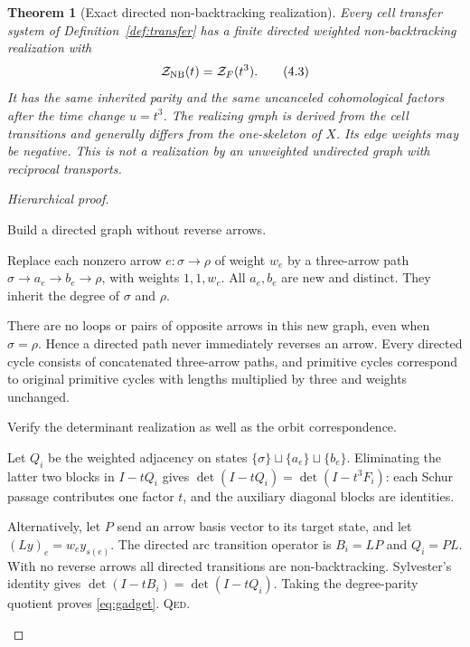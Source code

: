 \documentclass[11pt,a4paper]{article}
\newtheorem{theorem}[definition]{Theorem}
\theoremstyle{remark}\newtheorem{remark}[definition]{Remark}
\newcommand{\QED}{\textsc{Qed}}
\begin{document}
\begin{theorem}[Exact directed non-backtracking realization]\label{thm:gadget}
Every cell transfer system of Definition~\ref{def:transfer} has a finite directed weighted non-backtracking realization with
\[
\mathcal Z_{\rm NB}(t)=\mathcal Z_F(t^3).
\tag{4.3}\label{eq:gadget}
\]
It has the same inherited parity and the same uncanceled cohomological factors after the time change $u=t^3$. The realizing graph is derived from the cell transitions and generally differs from the one-skeleton of $X$. Its edge weights may be negative. This is not a realization by an unweighted undirected graph with reciprocal transports.
\end{theorem}
\begin{proof}[Hierarchical proof]
\begin{steps}
\item Build a directed graph without reverse arrows.
\begin{steps}
\item Replace each nonzero arrow $e:\sigma\to\rho$ of weight $w_e$ by a three-arrow path $\sigma\to a_e\to b_e\to\rho$, with weights $1,1,w_e$. All $a_e,b_e$ are new and distinct. They inherit the degree of $\sigma$ and $\rho$.
\item There are no loops or pairs of opposite arrows in this new graph, even when $\sigma=\rho$. Hence a directed path never immediately reverses an arrow. Every directed cycle consists of concatenated three-arrow paths, and primitive cycles correspond to original primitive cycles with lengths multiplied by three and weights unchanged.
\end{steps}
\item Verify the determinant realization as well as the orbit correspondence.
\begin{steps}
\item Let $Q_i$ be the weighted adjacency on states $\{\sigma\}\sqcup\{a_e\}\sqcup\{b_e\}$. Eliminating the latter two blocks in $I-tQ_i$ gives $\det(I-tQ_i)=\det(I-t^3F_i)$: each Schur passage contributes one factor $t$, and the auxiliary diagonal blocks are identities.
\item Alternatively, let $P$ send an arrow basis vector to its target state, and let $(Ly)_e=w_e y_{s(e)}$. The directed arc transition operator is $B_i=LP$ and $Q_i=PL$. With no reverse arrows all directed transitions are non-backtracking. Sylvester's identity gives $\det(I-tB_i)=\det(I-tQ_i)$. Taking the degree-parity quotient proves \eqref{eq:gadget}. \QED.
\end{steps}
\end{steps}
\end{proof}
\end{document}
